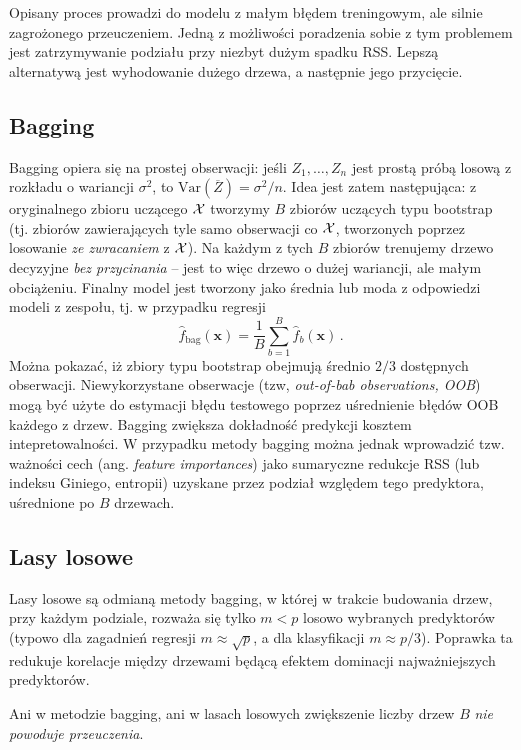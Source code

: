 \documentclass{myclass}
\begin{document}
Opisany proces prowadzi do modelu z małym błędem treningowym, ale silnie zagrożonego przeuczeniem.
Jedną z możliwości poradzenia sobie z tym problemem jest zatrzymywanie podziału przy niezbyt dużym
spadku RSS. Lepszą alternatywą jest wyhodowanie dużego drzewa, a następnie jego przycięcie.

\subsection{Bagging}

Bagging opiera się na prostej obserwacji: jeśli $Z_1,\ldots,Z_n$ jest prostą próbą losową z rozkładu
o wariancji $\sigma^2$, to $\text{Var}(\overline{Z}) = \sigma^2 / n$. Idea jest zatem następująca: z
oryginalnego zbioru uczącego $\mathcal{X}$ tworzymy $B$ zbiorów uczących typu bootstrap (tj. zbiorów
zawierających tyle samo obserwacji co $\mathcal{X}$, tworzonych poprzez losowanie \emph{ze zwracaniem} z
$\mathcal{X}$). Na każdym z tych $B$ zbiorów trenujemy drzewo decyzyjne \emph{bez przycinania} -- jest to
więc drzewo o dużej wariancji, ale małym obciążeniu. Finalny model jest tworzony jako średnia lub
moda z odpowiedzi modeli z zespołu, tj. w przypadku regresji
\[
    \hat{f}_\text{bag}(\bm{x}) = \frac{1}{B} \sum_{b=1}^B \hat{f}_b(\bm{x})\,.
\]
Można pokazać, iż zbiory typu bootstrap obejmują średnio $2/3$ dostępnych obserwacji.
Niewykorzystane obserwacje (tzw, \emph{out-of-bab observations, OOB}) mogą być użyte do estymacji
błędu testowego poprzez uśrednienie błędów OOB każdego z drzew. Bagging zwiększa dokładność
predykcji kosztem intepretowalności. W przypadku metody bagging można jednak wprowadzić tzw.
ważności cech (ang. \emph{feature importances}) jako sumaryczne redukcje RSS (lub indeksu Giniego,
entropii) uzyskane przez podział względem tego predyktora, uśrednione po $B$ drzewach.

\subsection{Lasy losowe}

Lasy losowe są odmianą metody bagging, w której w trakcie budowania drzew, przy każdym podziale,
rozważa się tylko $m < p$ losowo wybranych predyktorów (typowo dla zagadnień regresji $m \approx
\sqrt{p}$, a dla klasyfikacji $m \approx p/3$). Poprawka ta redukuje korelacje między drzewami
będącą efektem dominacji najważniejszych predyktorów.

Ani w metodzie bagging, ani w lasach losowych zwiększenie liczby drzew $B$ \emph{nie powoduje
przeuczenia}.
\end{document}
